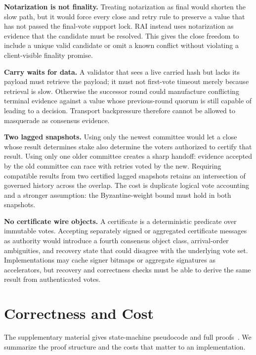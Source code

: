 \documentclass[sigplan,review,anonymous]{acmart}
\newcommand{\sys}{\textsc{RAI}\xspace}
\newcommand{\paragraphhead}[1]{\smallskip\noindent\textbf{#1}}
\begin{document}
\paragraphhead{Notarization is not finality.}
Treating notarization as final would shorten the slow path, but it would force every close and retry rule to preserve a value that has not passed the final-vote support lock.  \sys instead uses notarization as evidence that the candidate must be resolved.  This gives the close freedom to include a unique valid candidate or omit a known conflict without violating a client-visible finality promise.

\paragraphhead{Carry waits for data.}
A validator that sees a live carried hash but lacks its payload must retrieve the payload; it must not first-vote timeout merely because retrieval is slow.  Otherwise the successor round could manufacture conflicting terminal evidence against a value whose previous-round quorum is still capable of leading to a decision.  Transport backpressure therefore cannot be allowed to masquerade as consensus evidence.

\paragraphhead{Two lagged snapshots.}
Using only the newest committee would let a close whose result determines stake also determine the voters authorized to certify that result.  Using only one older committee creates a sharp handoff: evidence accepted by the old committee can race with retries voted by the new.  Requiring compatible results from two certified lagged snapshots retains an intersection of governed history across the overlap.  The cost is duplicate logical vote accounting and a stronger assumption: the Byzantine-weight bound must hold in both snapshots.

\paragraphhead{No certificate wire objects.}
A certificate is a deterministic predicate over immutable votes.  Accepting separately signed or aggregated certificate messages as authority would introduce a fourth consensus object class, arrival-order ambiguities, and recovery state that could disagree with the underlying vote set.  Implementations may cache signer bitmaps or aggregate signatures as accelerators, but recovery and correctness checks must be able to derive the same result from authenticated votes.

\section{Correctness and Cost}
\label{sec:correctness}

The supplementary material gives state-machine pseudocode and full proofs~\cite{raiSupplement}.  We summarize the proof structure and the costs that matter to an implementation.
\end{document}
